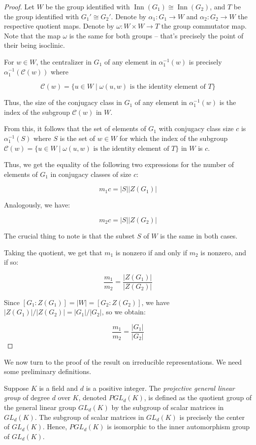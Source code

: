 \begin{proof}
  Let $W$ be the group identified with $\operatorname{Inn}(G_1) \cong
  \operatorname{Inn}(G_2)$, and $T$ be the group identified with $G_1'
  \cong G_2'$. Denote by $\alpha_1: G_1 \to W$ and $\alpha_2: G_2 \to
  W$ the respective quotient maps. Denote by $\omega: W \times W \to
  T$ the group commutator map. Note that the map $\omega$ is the same
  for both groups -- that's precisely the point of their being
  isoclinic.

  For $w \in W$, the centralizer in $G_1$ of any element in
  $\alpha_1^{-1}(w)$ is precisely $\alpha_1^{-1}(\mathcal{C}(w))$
  where
  
  $$\mathcal{C}(w) = \{ u \in W \mid \omega(u,w) \mbox{ is the identity element of } T \}$$

  Thus, the size of the conjugacy class in $G_1$ of any element in
  $\alpha_1^{-1}(w)$ is the index of the subgroup $\mathcal{C}(w)$ in $W$.
 
  From this, it follows that the set of elements of $G_1$ with
  conjugacy class size $c$ is $\alpha_1^{-1}(S)$ where $S$ is the set
  of $w \in W$ for which the index of the subgroup $\mathcal{C}(w) =
  \{ u \in W \mid \omega(u,w) \mbox{ is the identity element of } T
  \}$ in $W$ is $c$.

  Thus, we get the equality of the following two expressions for the
  number of elements of $G_1$ in conjugacy classes of size $c$:

  $$m_1c = |S||Z(G_1)|$$

  Analogously, we have:

  $$m_2c = |S||Z(G_2)|$$

  The crucial thing to note is that the subset $S$ of $W$ is the same
  in both cases.

  Taking the quotient, we get that $m_1$ is nonzero if and only if
  $m_2$ is nonzero, and if so:

  $$\frac{m_1}{m_2} = \frac{|Z(G_1)|}{|Z(G_2)|}$$

  Since $[G_1:Z(G_1)] = |W| = [G_2:Z(G_2)]$, we have 
  $|Z(G_1)|/|Z(G_2)| = |G_1|/|G_2|$, so we obtain:

  $$\frac{m_1}{m_2} = \frac{|G_1|}{|G_2|}$$

\end{proof}

We now turn to the proof of the result on irreducible
representations. We need some preliminary definitions.

\begin{definer}
  Suppose $K$ is a field and $d$ is a positive integer. The {\em
    projective general linear group} of degree $d$ over $K$, denoted
  $PGL_d(K)$, is defined as the quotient group of the general linear
  group $GL_d(K)$ by the subgroup of scalar matrices in $GL_d(K)$. The
  subgroup of scalar matrices in $GL_d(K)$ is precisely the center of
  $GL_d(K)$. Hence, $PGL_d(K)$ is isomorphic to the inner automorphism
  group of $GL_d(K)$.
\end{definer}

